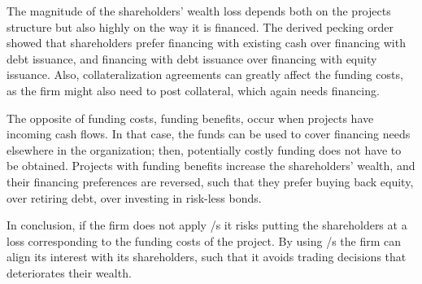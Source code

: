 \documentclass[main.tex]{subfiles}
\begin{document}
    The magnitude of the shareholders' wealth loss depends both on the projects structure
    but also highly on the way it is financed. 
    The derived pecking order showed that shareholders prefer 
    financing with existing cash over financing with debt issuance, 
    and financing with debt issuance over financing with equity issuance.
    Also, collateralization agreements can greatly affect the funding costs,
    as the firm might also need to post collateral, which again needs financing.

    The opposite of funding costs, funding benefits, occur when projects have incoming cash flows.
    In that case, the funds can be used to cover financing needs elsewhere in the organization;
    then, potentially costly funding does not have to be obtained.
    Projects with funding benefits increase the shareholders' wealth,
    and their financing preferences are reversed, 
    such that they prefer buying back equity, over retiring debt, over investing in risk-less bonds.

    In conclusion, if the firm does not apply \FVA/s it risks putting the shareholders at a loss
    corresponding to the funding costs of the project.
    By using \FVA/s the firm can align its interest with its shareholders,
    such that it avoids trading decisions that deteriorates their wealth. 
\end{document}
